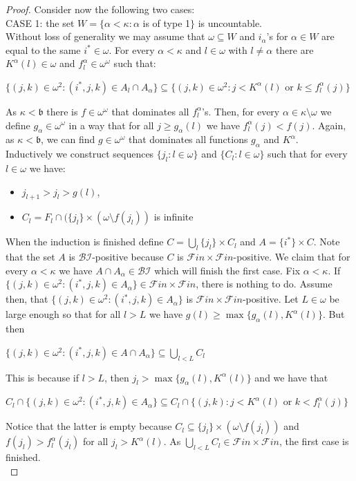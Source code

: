 \documentclass[10pt,a4paper]{amsart}
\newcommand{\BI}{\mathcal{BI}}
\newcommand{\Baire}{\omega^{\omega}}
\newcommand{\FF}{\mathcal{F}in\times\mathcal{F}in}
\newcommand{\bbb}{\mathfrak{b}}
\begin{document}
\begin{proof}
    Consider now the following two cases:\\
    CASE 1: the set $W=\{\alpha<\kappa: \alpha$ is of type 1$\}$ is uncountable.\\
    Without loss of generality we may assume that $\omega\subseteq W$ and $i_{\alpha}$'s for $\alpha\in W$ are equal to the same $i^{*}\in\omega$. For every $\alpha<\kappa$ and $l\in\omega$ with $l\neq\alpha$ there are $K^{\alpha}(l)\in\omega$ and $f^{\alpha}_{l}\in\Baire$ such that:
    \begin{center}
    $\{(j,k)\in\omega^{2}:(i^{*},j,k)\in A_{l}\cap A_{\alpha}\}\subseteq\{(j,k)\in\omega^{2}:j<K^{\alpha}(l)$ or $k\leq f^{\alpha}_{l}(j)\}$
    \end{center}
    As $\kappa<\bbb$ there is $f\in\Baire$ that dominates all $f^{\alpha}_{l}$'s. Then, for every $\alpha\in\kappa\setminus\omega$ we define $g_{\alpha}\in\Baire$ in a way that for all $j\geq g_{\alpha}(l)$ we have $f^{\alpha}_{l}(j)<f(j)$. Again, as $\kappa<\bbb$, we can find $g\in\Baire$ that dominates all functions $g_{\alpha}$ and $K^{\alpha}$.\\
    Inductively we construct sequences $\{j_{l}:l\in\omega\}$ and $\{C_{l}:l\in\omega\}$ such that for every $l\in\omega$ we have:
    \begin{itemize}
        \item[--] $j_{l+1}>j_{l}>g(l)$,
        \item[--] $C_{l}=F_{l}\cap (\{j_{l}\}\times(\omega\setminus f(j_{l}))$ is infinite
    \end{itemize}
    When the induction is finished define $C=\bigcup_{l}\{j_{l}\}\times C_{l}$ and $A=\{i^{*}\}\times C$. Note that the set $A$ is $\BI$-positive because $C$ is $\FF$-positive. We claim that for every $\alpha<\kappa$ we have $A\cap A_{\alpha}\in\BI$ which will finish the first case. Fix $\alpha<\kappa$. If $\{(j,k)\in\omega^{2}:(i^{*},j,k)\in A_{\alpha}\}\in\FF$, there is nothing to do. Assume then, that $\{(j,k)\in\omega^{2}:(i^{*},j,k)\in A_{\alpha}\}$ is $\FF$-positive. Let $L\in\omega$ be large enough so that for all $l>L$ we have $g(l)\geq\max\{g_{\alpha}(l),K^{\alpha}(l)\}$. But then
    \begin{center}
        $\{(j,k)\in\omega^{2}:(i^{*},j,k)\in A\cap A_{\alpha}\}\subseteq\bigcup_{l<L}C_{l}$
    \end{center}
    This is because if $l>L$, then $j_{l}>\max\{g_{\alpha}(l),K^{\alpha}(l)\}$ and we have that
    \begin{center}
    $C_{l}\cap\{(j,k)\in\omega^{2}:(i^{*},j,k)\in A_{\alpha}\}\subseteq C_{l}\cap \{(j,k):j<K^{\alpha}(l)$ or $k<f^{\alpha}_{l}(j)\}$
    \end{center}
    Notice that the latter is empty because $C_{l}\subseteq\{j_{l}\}\times(\omega\setminus f(j_{l}))$ and $f(j_{l})>f^{\alpha}_{l}(j_{l})$ for all $j_{l}>K^{\alpha}(l)$. As $\bigcup_{l<L}C_{l}\in\FF$, the first case is finished.\\
    

\end{proof}
\end{document}
